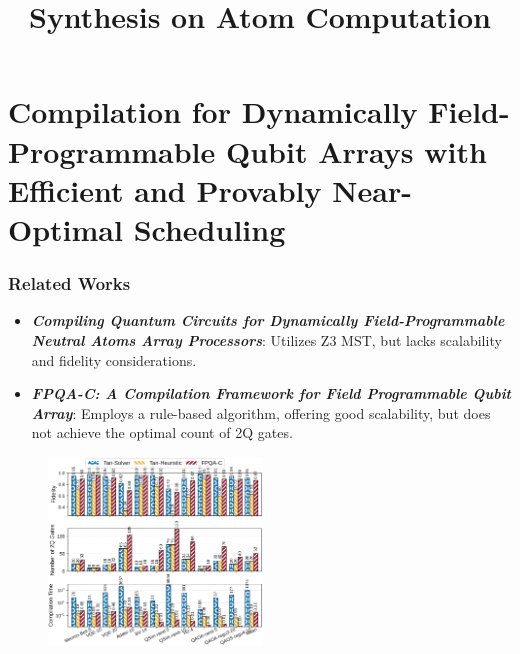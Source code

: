 \documentclass[18 pt]{beamer}
\title{Synthesis on Atom Computation}
\begin{document}
\begin{frame}[plain]
    \titlepage
\end{frame}
\section{Compilation for Dynamically Field-Programmable Qubit Arrays with Efficient and Provably Near-Optimal Scheduling}
\begin{frame}
    \frametitle{Related Works}
    \begin{itemize}
        \item \textbf{\textit{Compiling Quantum Circuits for Dynamically Field-Programmable Neutral Atoms Array Processors}}: Utilizes Z3 MST, but lacks scalability and fidelity considerations.
        \item \textbf{\textit{FPQA-C: A Compilation Framework for Field Programmable Qubit Array}}: Employs a rule-based algorithm, offering good scalability, but does not achieve the optimal count of 2Q gates.
    \end{itemize}
    \begin{figure}
        \includegraphics[height=5cm]{back.png}
    \end{figure}
\end{frame}
\end{document}
